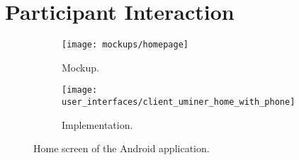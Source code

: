 
\section{Participant Interaction}

\begin{figure}
\begin{subfigure}[!t]{.48\textwidth}
  \centering
  \texttt{[image: mockups/homepage]}
  \caption{Mockup.}
  \label{fig:mockup_home_screen}
\end{subfigure}%
\begin{subfigure}[!t]{.52\textwidth}
  \centering
  \texttt{[image: user\_interfaces/client\_uminer\_home\_with\_phone]}
  \caption{Implementation.}
  \label{fig:implementation_home_screen}
\end{subfigure}
\caption{Home screen of the Android application.}
\label{fig:home_screen}
\end{figure}
\